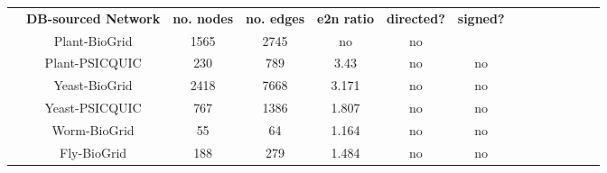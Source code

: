             \begin{table}[H]%
                \centering
                \setlength\arrayrulewidth{.1pt}%
                \scriptsize
                    \setlength\cellspacetoplimit{\myPadTop}\setlength\cellspacebottomlimit{\myPadBottom}
                    \begin{tabular}{@{}Sc Sc|Sc|Sc|Sc|Sc|Sc@{}}
                        & \textbf{\normalsize DB-sourced Network} & \textbf{\normalsize no. nodes} & \textbf{\normalsize no. edges}	& \textbf{\normalsize e2n ratio} & \textbf{\normalsize directed? } & \textbf{\normalsize signed? } %
                            \\[.05cm] 
                                    & Plant-BioGrid  \cite{chatr-aryamontri_biogrid_2017}  & 1565      & 2745      & no & no %
                            \\[.05cm] 
                                   & Plant-PSICQUIC  \cite{aranda_psicquic_2011}         & 230       & 789       & 3.43   & no & no   %
                            \\[.05cm] 
                                    & Yeast-BioGrid  \cite{chatr-aryamontri_biogrid_2017}  & 2418      & 7668      & 3.171  & no & no    %
                            \\[.05cm] 
                                    & Yeast-PSICQUIC  \cite{aranda_psicquic_2011}        & 767       & 1386      & 1.807  & no & no    %
                            \\[.05cm] 
                                    & Worm-BioGrid  \cite{chatr-aryamontri_biogrid_2017}   & 55        & 64        & 1.164  & no & no    %
                            \\[.05cm] 
                                    & Fly-BioGrid  \cite{chatr-aryamontri_biogrid_2017}    & 188       & 279       & 1.484  & no & no    %
                            \\[.05cm] 

\end{tabular}
\end{table}
